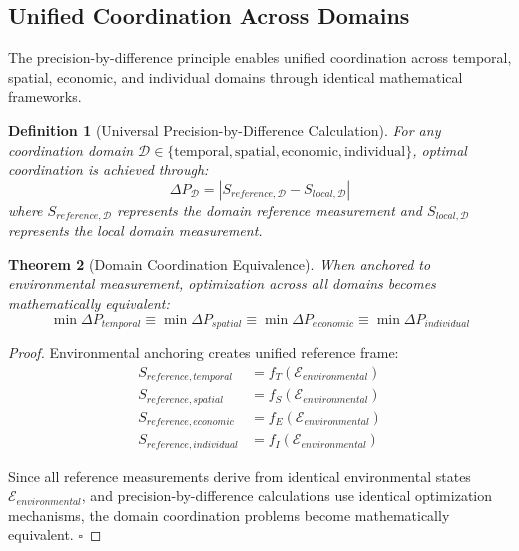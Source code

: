 \documentclass[12pt,a4paper]{article}
\newtheorem{theorem}{Theorem}
\newtheorem{definition}[theorem]{Definition}
\begin{document}
\subsection{Unified Coordination Across Domains}

The precision-by-difference principle enables unified coordination across temporal, spatial, economic, and individual domains through identical mathematical frameworks.

\begin{definition}[Universal Precision-by-Difference Calculation]
For any coordination domain $\mathcal{D} \in \{\text{temporal}, \text{spatial}, \text{economic}, \text{individual}\}$, optimal coordination is achieved through:
\begin{equation}
\Delta P_{\mathcal{D}} = |S_{reference,\mathcal{D}} - S_{local,\mathcal{D}}|
\end{equation}
where $S_{reference,\mathcal{D}}$ represents the domain reference measurement and $S_{local,\mathcal{D}}$ represents the local domain measurement.
\end{definition}

\begin{theorem}[Domain Coordination Equivalence]
When anchored to environmental measurement, optimization across all domains becomes mathematically equivalent:
\begin{equation}
\min \Delta P_{temporal} \equiv \min \Delta P_{spatial} \equiv \min \Delta P_{economic} \equiv \min \Delta P_{individual}
\end{equation}
\end{theorem}

\begin{proof}
Environmental anchoring creates unified reference frame:
\begin{align}
S_{reference,temporal} &= f_T(\mathcal{E}_{environmental}) \\
S_{reference,spatial} &= f_S(\mathcal{E}_{environmental}) \\
S_{reference,economic} &= f_E(\mathcal{E}_{environmental}) \\
S_{reference,individual} &= f_I(\mathcal{E}_{environmental})
\end{align}

Since all reference measurements derive from identical environmental states $\mathcal{E}_{environmental}$, and precision-by-difference calculations use identical optimization mechanisms, the domain coordination problems become mathematically equivalent. $\square$
\end{proof}
\end{document}
